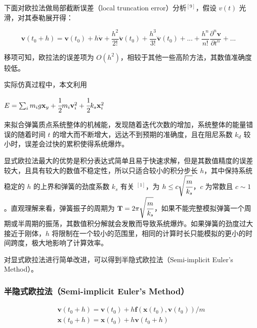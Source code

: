 \documentclass[UTF8]{ctexart}
\begin{document}
下面对欧拉法做局部截断误差（local truncation error）分析${}^{[9]}$，假设 $v(t)$ 光滑，对其泰勒展开得： \par

\begin{large}
\begin{equation}
\mathbf{v}(t_0+h) = \mathbf{v}(t_0) + h \dot{\mathbf{v}} + \frac{h^2}{2!} \ddot{\mathbf{v}}(t_0) + 
\frac{h^3}{3!} \dddot{\mathbf{v}}(t_0)+...+ \frac{h^n}{n!} \frac{\partial^n \mathbf{v}}{\partial t^n} + ...
\end{equation}
\end{large}

移项可知，欧拉法的误差项为 $O(h^2)$，相较于其他一些高阶方法，其数值准确度较低。 \par

实际仿真过程中，本文利用 \begin{large} $E = \sum_{i} m_ig\mathbf{x}_y + \cfrac{1}{2} m_i \mathbf{v}_{i}^{2} + \cfrac{1}{2} k_s \mathbf{x}_{i}^{2}$ \end{large} 来拟合弹簧质点系统整体的机械能，发现随着迭代次数的增加，系统整体的能量错误的随着时间 $t$ 的增大而不断增大，远达不到预期的准确度，且在阻尼系数 $k_d$ 较小时，误差会过快的累积使得系统爆炸。

显式欧拉法最大的优势是积分表达式简单且易于快速求解，但是其数值精度的误差较大，且具有较大的数值不稳定性，所以只适合较小的积分步长 $h$，其中保持系统稳定的 $h$ 的上界和弹簧的劲度系数 $k_s$ 有关 ${}^{[1]}$，为 $h \le c \sqrt{\cfrac{m}{k_s}}$，$c$ 为常数且 $c \sim 1$。直观理解来看，弹簧振子的周期为 $\mathbf{T} = 2 \pi \sqrt{\cfrac{m}{k_s}}$，如果不能完整模拟弹簧一个周期或半周期的振荡，其数值积分解就会发散而导致系统爆炸。如果弹簧的劲度过大接近于刚体，$h$ 将限制在一个较小的范围里，相同的计算时长只能模拟的更小的时间跨度，极大地影响了计算效率。 \par

对显式欧拉法进行简单改进，可以得到半隐式欧拉法（Semi-implicit Euler's Method）。

\subsubsection{半隐式欧拉法（Semi-implicit Euler's Method）}

\begin{large}
\begin{equation}
\begin{split}
& \mathbf{v}(t_0 + h) = \mathbf{v}(t_0) + h \mathbf{f}(\mathbf{x}(t_0), \mathbf{v}(t_0)) / m \\
& \mathbf{x}(t_0 + h) = \mathbf{x}(t_0) + h \mathbf{v} (t_0 + h)
\end{split}
\end{equation}
\end{large}
\end{document}
